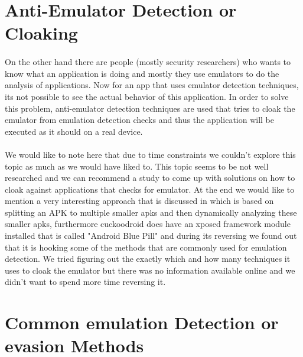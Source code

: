 \documentclass[../main.tex]{subfile}
\begin{document}
	\section{Anti-Emulator Detection or Cloaking}\label{sec::anti_emu_detection}
	\paragraph{} On the other hand there are people (mostly security researchers) who wants to know what an application is doing and mostly they use emulators to do the analysis of applications. Now for an app that uses emulator detection techniques, its not possible to see the actual behavior of this application. In order to solve this problem, anti-emulator detection techniques are used that tries to cloak the emulator from emulation detection checks and thus the application will be executed as it should on a real device.
	\paragraph{} We would like to note here that due to time constraints we couldn't explore this topic as much as we would have liked to. This topic seems to be not well researched and we can recommend a study to come up with solutions on how to cloak against applications that checks for emulator. At the end we would like to mention a very interesting approach that is discussed in \cite{rasthofer2016harvesting} which is based on splitting an APK to multiple smaller apks and then dynamically analyzing these smaller apks, furthermore cuckoodroid does have an xposed framework module installed that is called "Android Blue Pill" and during its reversing we found out that it is hooking some of the methods that are commonly used for emulation detection. We tried figuring out the exactly which and how many techniques it uses to cloak the emulator but there was no information available online and we didn't want to spend more time reversing it.
	
	\section{Common emulation Detection or evasion Methods}\label{sec::common_methods_detection}
\end{document}
